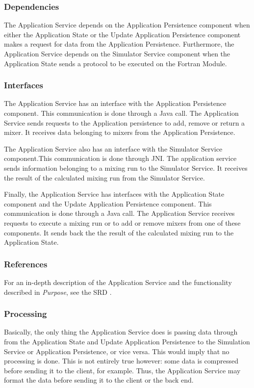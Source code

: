 \subsubsection*{Dependencies}
The Application Service depends on the Application Persistence component when either the Application State or the Update Application Persistence component makes a request for data from the Application Persistence. Furthermore, the Application Service depends on the Simulator Service component when the Application State sends a protocol to be executed on the Fortran Module.

\subsubsection*{Interfaces}
The Application Service has an interface with the Application Persistence component. This communication is done through a Java call. The Application Service sends requests to the Application persistence to add, remove or return a mixer. It receives data belonging to mixers from the Application Persistence.

The Application Service also has an interface with the Simulator Service component.This communication is done through JNI. The application service sends information belonging to a mixing run to the Simulator Service. It receives the result of the calculated mixing run from the Simulator Service.

Finally, the Application Service has interfaces with the Application State component and the Update Application Persistence component. This communication is done through a Java call. The Application Service receives requests to execute a mixing run or to add or remove mixers from one of these components. It sends back the the result of the calculated mixing run to the Application State.

\subsubsection*{References}
For an in-depth description of the Application Service and the functionality described in \emph{Purpose}, see the SRD \cite{srd}.

\subsubsection*{Processing}
Basically, the only thing the Application Service does is passing data through from the Application State and Update Application Persistence to the Simulation Service or Application Persistence, or vice versa. This would imply that no processing is done. This is not entirely true however: some data is compressed before sending it to the client, for example. Thus, the Application Service may format the data before sending it to the client or the back end.

